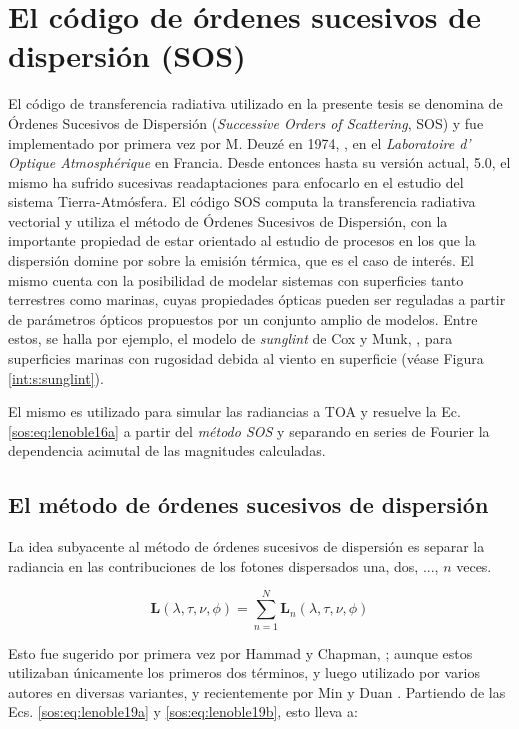 \section{El código de órdenes sucesivos de dispersión (SOS)}
\label{sos:s:sos}
    El código de transferencia radiativa utilizado en la presente tesis se denomina de Órdenes Sucesivos de Dispersión (\textit{Successive Orders of Scattering}, SOS) y fue implementado por primera vez por M. Deuzé en 1974, \cite{lafrance2002}, en el \textit{Laboratoire d' Optique Atmosphérique} en Francia. Desde entonces hasta su versión actual, 5.0, el mismo ha sufrido sucesivas readaptaciones para enfocarlo en el estudio del sistema Tierra-Atmósfera. El código SOS computa la transferencia radiativa vectorial y utiliza el método de Órdenes Sucesivos de Dispersión, con la importante propiedad de estar orientado al estudio de procesos en los que la dispersión domine por sobre la emisión térmica, que es el caso de interés. El mismo cuenta con la posibilidad de modelar sistemas con superficies tanto terrestres como marinas, cuyas propiedades ópticas pueden ser reguladas a partir de parámetros ópticos propuestos por un conjunto amplio de modelos. Entre estos, se halla por ejemplo, el modelo de \textit{sunglint} de Cox y Munk, \cite{coxmunk1954}, para superficies marinas con rugosidad debida al viento en superficie (véase Figura \ref{int:s:sunglint}).
    
    El mismo es utilizado para simular las radiancias a TOA y resuelve la Ec. \ref{sos:eq:lenoble16a} a partir del \textit{método SOS} y separando en series de Fourier la dependencia acimutal de las magnitudes calculadas.

    \subsection{El método de órdenes sucesivos de dispersión}
    \label{sos:s:metodosos}

        La idea subyacente al método de órdenes sucesivos de dispersión es separar la radiancia en las contribuciones de los fotones dispersados una, dos, ..., $n$ veces.
        
        \begin{equation}
        \textbf{L}(\lambda,\tau,\nu,\phi)=\sum_{n=1}^{N}\textbf{L}_{n}(\lambda,\tau,\nu,\phi)
        \label{soslenoble20}
        \end{equation}
        
        Esto fue sugerido por primera vez por Hammad y Chapman, \cite{hammad1948}; aunque estos utilizaban únicamente los primeros dos términos, y luego utilizado por varios autores en diversas variantes, y recientemente por Min y Duan \cite{min2004}. Partiendo de las Ecs. \ref{sos:eq:lenoble19a} y \ref{sos:eq:lenoble19b}, esto lleva a:
        
